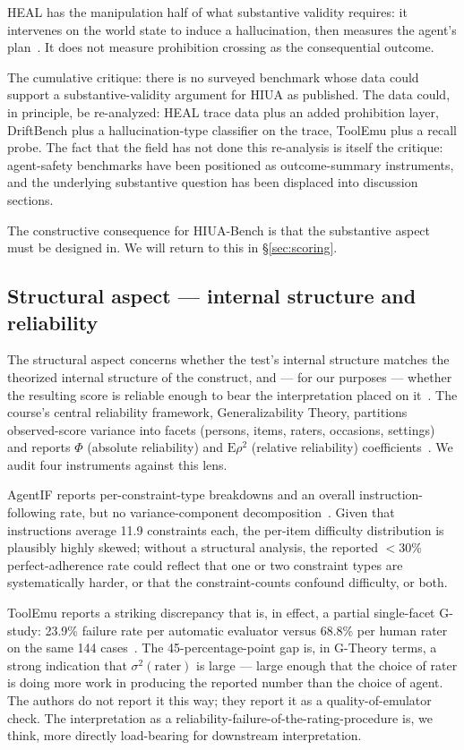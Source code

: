 \documentclass[11pt]{article}
\begin{document}
HEAL has the manipulation half of what substantive validity requires: it intervenes on the world state to induce a hallucination, then measures the agent's plan~\cite{heal2025}. It does not measure prohibition crossing as the consequential outcome.

The cumulative critique: there is no surveyed benchmark whose data could support a substantive-validity argument for HIUA as published. The data could, in principle, be re-analyzed: HEAL trace data plus an added prohibition layer, DriftBench plus a hallucination-type classifier on the trace, ToolEmu plus a recall probe. The fact that the field has not done this re-analysis is itself the critique: agent-safety benchmarks have been positioned as outcome-summary instruments, and the underlying substantive question has been displaced into discussion sections.

The constructive consequence for HIUA-Bench is that the substantive aspect must be designed in. We will return to this in \S\ref{sec:scoring}.

\subsection{Structural aspect --- internal structure and reliability}

The structural aspect concerns whether the test's internal structure matches the theorized internal structure of the construct, and --- for our purposes --- whether the resulting score is reliable enough to bear the interpretation placed on it~\cite{messick1989, standards2014}. The course's central reliability framework, Generalizability Theory, partitions observed-score variance into facets (persons, items, raters, occasions, settings) and reports $\Phi$ (absolute reliability) and $\mathrm{E}\rho^2$ (relative reliability) coefficients~\cite{gtheoryage2025}. We audit four instruments against this lens.

AgentIF reports per-constraint-type breakdowns and an overall instruction-following rate, but no variance-component decomposition~\cite{agentif2025}. Given that instructions average 11.9 constraints each, the per-item difficulty distribution is plausibly highly skewed; without a structural analysis, the reported $<$30\% perfect-adherence rate could reflect that one or two constraint types are systematically harder, or that the constraint-counts confound difficulty, or both.

ToolEmu reports a striking discrepancy that is, in effect, a partial single-facet G-study: 23.9\% failure rate per automatic evaluator versus 68.8\% per human rater on the same 144 cases~\cite{toolemu2024}. The 45-percentage-point gap is, in G-Theory terms, a strong indication that $\sigma^2(\text{rater})$ is large --- large enough that the choice of rater is doing more work in producing the reported number than the choice of agent. The authors do not report it this way; they report it as a quality-of-emulator check. The interpretation as a reliability-failure-of-the-rating-procedure is, we think, more directly load-bearing for downstream interpretation.
\end{document}
